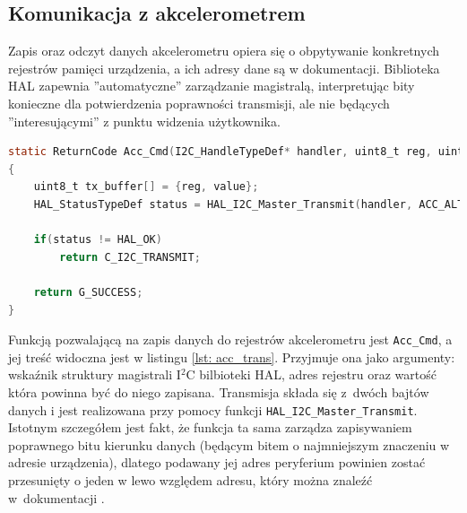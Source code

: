 \subsection{Komunikacja z akcelerometrem}
Zapis oraz odczyt danych akcelerometru opiera się o obpytywanie konkretnych rejestrów pamięci urządzenia, a ich adresy dane są w dokumentacji. Biblioteka HAL zapewnia ''automatyczne'' zarządzanie magistralą, interpretując bity konieczne dla potwierdzenia poprawności transmisji, ale nie będących ''interesującymi'' z punktu widzenia użytkownika. 
\begin{lstlisting}[language=C,
caption={Zapis wartości do rejestru pamięci akcelerometru},
label={lst: acc_trans}]
static ReturnCode Acc_Cmd(I2C_HandleTypeDef* handler, uint8_t reg, uint8_t value)
{
	uint8_t tx_buffer[] = {reg, value};
	HAL_StatusTypeDef status = HAL_I2C_Master_Transmit(handler, ACC_ALT_ADDRESS, tx_buffer, 2, 200);

	if(status != HAL_OK)
		return C_I2C_TRANSMIT;

	return G_SUCCESS;
}
\end{lstlisting}
Funkcją pozwalającą na zapis danych do rejestrów akcelerometru jest \texttt{Acc\_Cmd}, a jej treść widoczna jest w listingu \ref{lst: acc_trans}. Przyjmuje ona jako argumenty: wskaźnik struktury magistrali I$^2$C bilbioteki HAL, adres rejestru oraz wartość która powinna być do niego zapisana. Transmisja składa się z~dwóch bajtów danych i jest realizowana przy pomocy funkcji \texttt{HAL\_I2C\_Master\_Transmit}. Istotnym szczegółem jest fakt, że funkcja ta sama zarządza zapisywaniem poprawnego bitu kierunku danych \cite{um1725} (będącym bitem o najmniejszym znaczeniu w adresie urządzenia), dlatego podawany jej adres peryferium powinien zostać przesunięty o jeden w lewo względem adresu, który można znaleźć w~dokumentacji \cite{adxl345}. 

